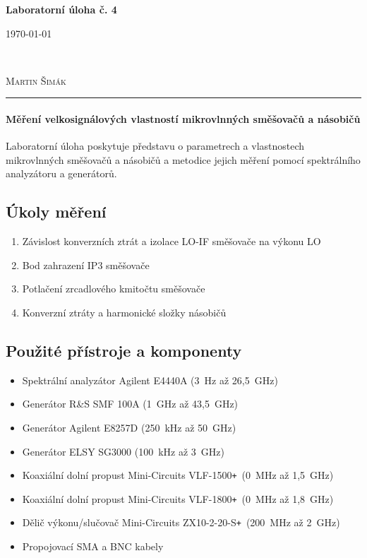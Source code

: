 \documentclass[11pt,a4paper]{article}
\newcommand{\plus}{{\texttt{+}}}
\begin{document}

\begin{center}
    {\LARGE\textbf{Laboratorní úloha č. 4}}\\[3mm]
    \begin{minipage}{0.4\textwidth}
        \begin{flushleft}
            \textsc{\today}
        \end{flushleft}
    \end{minipage}
    ~
    \begin{minipage}{0.4\textwidth}
        \begin{flushright}
            \textsc{Martin Šimák}
        \end{flushright}
    \end{minipage}
    \noindent\rule{14.5cm}{0.4pt}
\end{center}

\paragraph*{Měření velkosignálových vlastností mikrovlnných směšovačů a násobičů} Laboratorní úloha poskytuje představu o parametrech a vlastnostech mikrovlnných směšovačů a násobičů a metodice jejich měření pomocí spektrálního analyzátoru a generátorů.

\subsection*{Úkoly měření}
\begin{enumerate}
    \item Závislost konverzních ztrát a izolace LO-IF směšovače na výkonu LO
    \item Bod zahrazení IP3 směšovače
    \item Potlačení zrcadlového kmitočtu směšovače
    \item Konverzní ztráty a harmonické složky násobičů
\end{enumerate}

\subsection*{Použité přístroje a komponenty}
\begin{itemize}
    \item Spektrální analyzátor Agilent E4440A (3~Hz až 26,5~GHz)
    \item Generátor R\&S SMF 100A (1~GHz až 43,5~GHz)
    \item Generátor Agilent E8257D (250~kHz až 50~GHz)
    \item Generátor ELSY SG3000 (100~kHz až 3~GHz)
    \item Koaxiální dolní propust Mini-Circuits VLF-1500\plus~(0~MHz až 1,5~GHz)
    \item Koaxiální dolní propust Mini-Circuits VLF-1800\plus~(0~MHz až 1,8~GHz)
    \item Dělič výkonu/slučovač Mini-Circuits ZX10-2-20-S\plus~(200~MHz až 2~GHz)
    \item Propojovací SMA a BNC kabely
\end{itemize}
\end{document}
